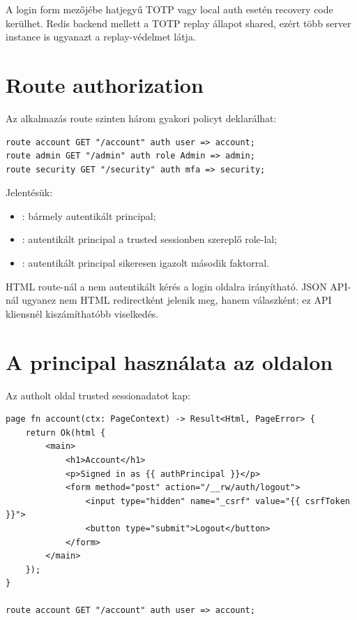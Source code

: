 A login form  mezőjébe hatjegyű TOTP vagy local auth esetén recovery code kerülhet. Redis backend mellett a TOTP replay állapot shared, ezért több server instance is ugyanazt a replay-védelmet látja.

\section{Route authorization}

Az alkalmazás route szinten három gyakori policyt deklarálhat:

\begin{lstlisting}[language=RWLang]
route account GET "/account" auth user => account;
route admin GET "/admin" auth role Admin => admin;
route security GET "/security" auth mfa => security;
\end{lstlisting}

Jelentésük:

\begin{itemize}
  \item {}: bármely autentikált principal;
  \item {}: autentikált principal a trusted sessionben szereplő  role-lal;
  \item {}: autentikált principal sikeresen igazolt második faktorral.
\end{itemize}

HTML route-nál a nem autentikált kérés a login oldalra irányítható. JSON API-nál ugyanez nem HTML redirectként jelenik meg, hanem  válaszként; ez API kliensnél kiszámíthatóbb viselkedés.

\section{A principal használata az oldalon}

Az autholt oldal trusted sessionadatot kap:

\begin{lstlisting}[language=RWLang]
page fn account(ctx: PageContext) -> Result<Html, PageError> {
    return Ok(html {
        <main>
            <h1>Account</h1>
            <p>Signed in as {{ authPrincipal }}</p>
            <form method="post" action="/__rw/auth/logout">
                <input type="hidden" name="_csrf" value="{{ csrfToken }}">
                <button type="submit">Logout</button>
            </form>
        </main>
    });
}

route account GET "/account" auth user => account;
\end{lstlisting}

